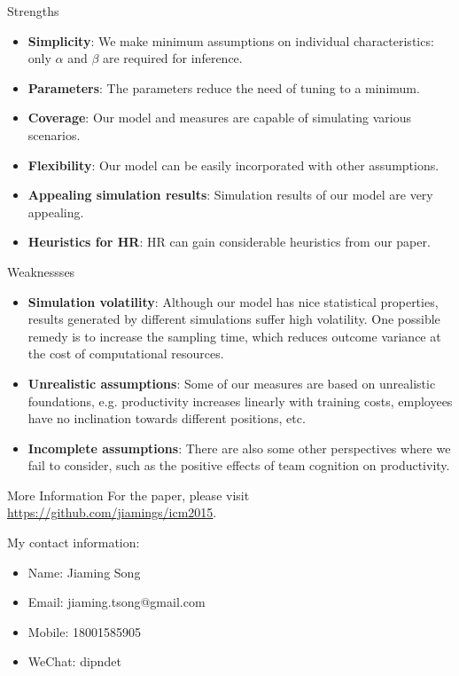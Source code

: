\documentclass{beamer}
\begin{document}
\begin{frame}{Strengths}
\begin{itemize}
\item \textbf{Simplicity}: We make minimum assumptions on individual characteristics: only $\alpha$ and $\beta$ are required for inference. 
\item \textbf{Parameters}: The parameters reduce the need of tuning to a minimum.
\item \textbf{Coverage}: Our model and measures are capable of simulating various scenarios.
\item \textbf{Flexibility}: Our model can be easily incorporated with other assumptions.
\item \textbf{Appealing simulation results}: Simulation results of our model are very appealing.  
\item \textbf{Heuristics for HR}: HR can gain considerable heuristics from our paper.
\end{itemize}
\end{frame}

\begin{frame}{Weaknessses}
\begin{itemize}
\item \textbf{Simulation volatility}: Although our model has nice statistical properties, results generated by different simulations suffer high volatility. One possible remedy is to increase the sampling time, which reduces outcome variance at the cost of computational resources.

\item \textbf{Unrealistic assumptions}: Some of our measures are based on unrealistic foundations, e.g. productivity increases linearly with training costs, employees have no inclination towards different positions, etc.

\item \textbf{Incomplete assumptions}: There are also some other perspectives where we fail to consider, such as the positive effects of team cognition on productivity. 
\end{itemize}
\end{frame}

\begin{frame}{More Information}
For the paper, please visit \url{https://github.com/jiamings/icm2015}. \\\vspace{0.5em}

My contact information:
\begin{itemize}
\item Name: Jiaming Song
\item Email: jiaming.tsong@gmail.com
\item Mobile: 18001585905
\item WeChat: dipndet
\end{itemize}

\end{frame}
\end{document}
